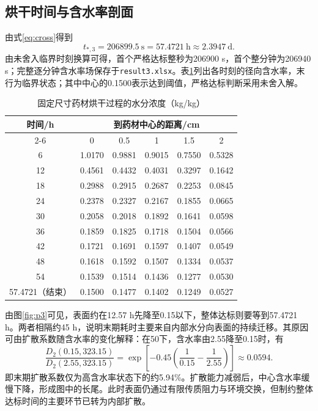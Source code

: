 \subsection{烘干时间与含水率剖面}
由式\eqref{eq:cross}得到
\begin{equation}
\boxed{t_{*,3}=206899.5\ \mathrm{s}=57.4721\ \mathrm{h}\approx2.3947\ \mathrm{d}.}
\end{equation}
由未舍入临界时刻换算可得，首个严格达标整秒为206900 s，首个整分钟为206940 s；完整逐分钟含水率场保存于\texttt{result3.xlsx}。表\ref{tab:p3}列出各时刻的径向含水率，末行为临界状态；其中中心的0.1500表示达到阈值，严格达标判断采用未舍入解。
\begin{table}[!htbp]\centering
\caption{固定尺寸药材烘干过程的水分浓度（kg/kg）}\label{tab:p3}
\begin{tabular}{cccccc}\toprule
\multirow[c]{2}{*}{时间/h}&\multicolumn{5}{c}{到药材中心的距离/cm}\\\cmidrule(lr){2-6}
&0&0.5&1&1.5&2\\\midrule
6&1.0170&0.9881&0.9015&0.7550&0.5328\\
12&0.4561&0.4432&0.4031&0.3297&0.1642\\
18&0.2988&0.2915&0.2687&0.2253&0.0845\\
24&0.2378&0.2327&0.2167&0.1855&0.0665\\
30&0.2058&0.2018&0.1892&0.1641&0.0598\\
36&0.1859&0.1825&0.1718&0.1504&0.0566\\
42&0.1721&0.1691&0.1597&0.1407&0.0549\\
48&0.1618&0.1592&0.1507&0.1334&0.0537\\
54&0.1539&0.1514&0.1436&0.1277&0.0530\\
57.4721（结束）&0.1500&0.1477&0.1402&0.1249&0.0527\\\bottomrule
\end{tabular}\end{table}

由图\ref{fig:p3}可见，表面约在12.57 h先降至0.15\cunit 以下，整体达标则要等到57.4721 h。两者相隔约45 h，说明末期耗时主要来自内部水分向表面的持续迁移。其原因可由扩散系数随含水率的变化解释：在50\tempunit 下，含水率由2.55降至0.15时，有
\begin{equation}
\frac{D_2(0.15,323.15)}{D_2(2.55,323.15)}
=\exp\left[-0.45\left(\frac1{0.15}-\frac1{2.55}\right)\right]\approx0.0594.
\end{equation}
即末期扩散系数仅为高含水率状态下的约5.94\%。扩散能力减弱后，中心含水率缓慢下降，形成图中的长尾。此时表面仍通过有限传质阻力与环境交换，但制约整体达标时间的主要环节已转为内部扩散。

